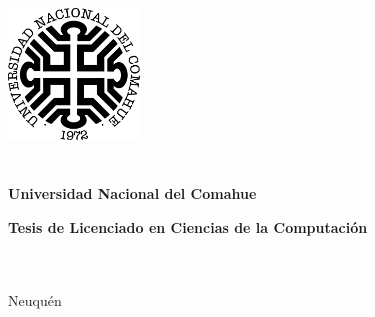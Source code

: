\documentclass[12pt,spanish]{book}
\begin{document}
\frontmatter

\titlepage

\begin{center}
\ \\
\ \\
\vspace{-1cm}
 
\includegraphics[width=3.5cm,height=3.5cm]{unc.png}\\
\ \\
\ \\
{\Large{\bf \sc Universidad Nacional del Comahue}}\\


\vspace{4cm}

{\Large {\bf\sc Tesis de Licenciado en Ciencias de la Computaci\'on}}\\
\ \\
\ \\
\vspace{3.5cm}


\vspace{2cm}
\vfill

{\Large {\sc Neuqu\'en}\hspace{6cm}{\sc Argentina}}\\

\end{center}

\vfill
\end{document}
